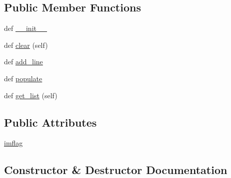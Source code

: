 \subsection*{Public Member Functions}
\begin{DoxyCompactItemize}
\item 
def \hyperlink{class_uni_dec_1_1unidec__modules_1_1_manual_selection_window_1_1_manual_list_crtl_abb7f3fa3e283d67908a7afa5a13ebe8c}{\+\_\+\+\_\+init\+\_\+\+\_\+}
\item 
def \hyperlink{class_uni_dec_1_1unidec__modules_1_1_manual_selection_window_1_1_manual_list_crtl_ab96b62bcc92ea4055b1f2634be0e0ecc}{clear} (self)
\item 
def \hyperlink{class_uni_dec_1_1unidec__modules_1_1_manual_selection_window_1_1_manual_list_crtl_adf69df27a1c14004e0e5d656be1fb496}{add\+\_\+line}
\item 
def \hyperlink{class_uni_dec_1_1unidec__modules_1_1_manual_selection_window_1_1_manual_list_crtl_a14d70164c5d08c0731f92bf896a2db05}{populate}
\item 
def \hyperlink{class_uni_dec_1_1unidec__modules_1_1_manual_selection_window_1_1_manual_list_crtl_a023bb21474365a90a62d36fb1130a1d5}{get\+\_\+list} (self)
\end{DoxyCompactItemize}
\subsection*{Public Attributes}
\begin{DoxyCompactItemize}
\item 
\hyperlink{class_uni_dec_1_1unidec__modules_1_1_manual_selection_window_1_1_manual_list_crtl_acc795d966e8cfe2e06060a04a366baa5}{imflag}
\end{DoxyCompactItemize}


\subsection{Constructor \& Destructor Documentation}
\hypertarget{class_uni_dec_1_1unidec__modules_1_1_manual_selection_window_1_1_manual_list_crtl_abb7f3fa3e283d67908a7afa5a13ebe8c}{}
